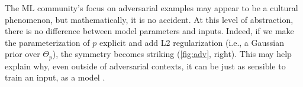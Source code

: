The ML community's focus on adversarial examples
    may appear to be a cultural phenomenon,
    but mathematically,
     it is no accident.
At this level of abstraction, there is no difference between
    model parameters and inputs.
Indeed, if we make the parameterization of $p$ explicit
and add L2 regularization
(i.e., a Gaussian prior over $\Theta_p$),
the symmetry
becomes striking (\cref{fig:adv}, right).
This may help explain why,
    even outside of adversarial contexts,
it can be just as sensible to train an input, as a model \citep{FNNS}.
